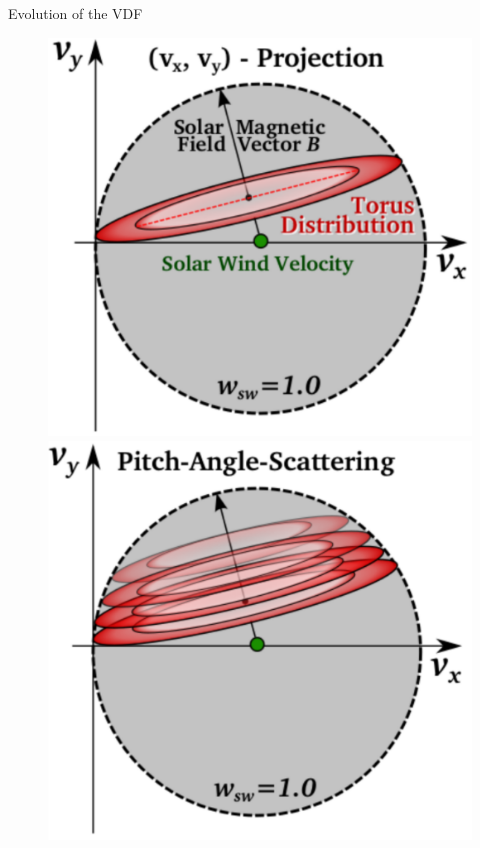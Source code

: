 \documentclass{beamer}
\begin{document}
\begin{frame}{Evolution of the VDF}
	\begin{figure}
		\includegraphics[scale=0.17]{Pics/torus.pdf}
		\hspace{0.001cm}
		\includegraphics[scale=0.17]{Pics/PAS.pdf}
		\hspace{0.001cm}

\end{figure}
\end{frame}
\end{document}
